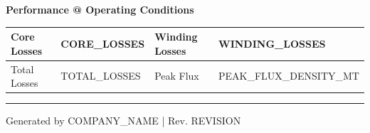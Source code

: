 \documentclass[10pt,a4paper]{article}
\begin{document}
\vspace{5mm}

\noindent\textbf{\textcolor{headerblue}{Performance @ Operating Conditions}}
\vspace{2mm}

\begin{tabular}{|l|l||l|l|}
\hline
Core Losses & {{CORE_LOSSES}} & Winding Losses & {{WINDING_LOSSES}} \\
\hline
Total Losses & {{TOTAL_LOSSES}} & Peak Flux & {{PEAK_FLUX_DENSITY_MT}} \\
\hline
\end{tabular}

\vspace{1cm}

\hrule
\vspace{3mm}
\footnotesize
\noindent Generated by {{COMPANY_NAME}} | Rev. {{REVISION}}
\end{document}
